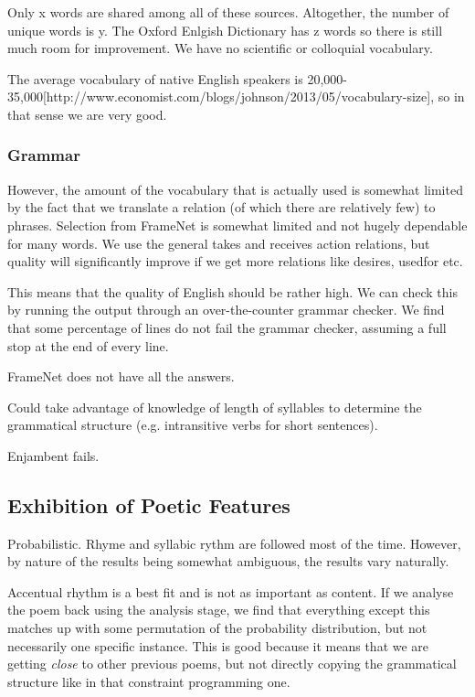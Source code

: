 Only x words are shared among all of these sources. Altogether, the number of unique words is y. The Oxford Enlgish Dictionary has z words so there is still much room for improvement. We have no scientific or colloquial vocabulary. 

The average vocabulary of native English speakers is 20,000-35,000[http://www.economist.com/blogs/johnson/2013/05/vocabulary-size], so in that sense we are very good.

\subsubsection{Grammar}
However, the amount of the vocabulary that is actually used is somewhat limited by the fact that we translate a relation (of which there are relatively few) to phrases. Selection from FrameNet is somewhat limited and not hugely dependable for many words. We use the general takes and receives action relations, but quality will significantly improve if we get more relations like desires, usedfor etc.

This means that the quality of English should be rather high. We can check this by running the output through an over-the-counter grammar checker. We find that some percentage of lines do not fail the grammar checker, assuming a full stop at the end of every line.

FrameNet does not have all the answers.

Could take advantage of knowledge of length of syllables to determine the grammatical structure (e.g. intransitive verbs for short sentences).

Enjambent fails.

\subsection{Exhibition of Poetic Features}
Probabilistic. Rhyme and syllabic rythm are followed most of the time. However, by nature of the results being somewhat ambiguous, the results vary naturally.

Accentual rhythm is a best fit and is not as important as content. If we analyse the poem back using the analysis stage, we find that everything except this matches up with some permutation of the probability distribution, but not necessarily one specific instance. This is good because it means that we are getting \textit{close} to other previous poems, but not directly copying the grammatical structure like in that constraint programming one.

